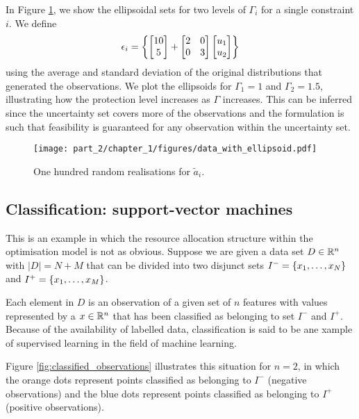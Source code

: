 In Figure \ref{fig:ellipsoids}, we show the ellipsoidal sets for two levels of $\Gamma_i$ for a single constraint $i$. We define 
%
\begin{align}
	\epsilon_i = \left\{ \begin{bmatrix} 10 \\ 5 \end{bmatrix} + \begin{bmatrix} 2 & 0 \\ 0 & 3 \end{bmatrix} \begin{bmatrix} u_1 \\ u_2 \end{bmatrix} \right \}
\end{align}
%
using the average and standard deviation of the original distributions that generated the observations. We plot the ellipsoids for $\Gamma_1 = 1$ and $\Gamma_2 = 1.5$, illustrating how the protection level increases as $\Gamma$ increases. This can be inferred since the uncertainty set covers more of the observations and the formulation is such that feasibility is guaranteed for any observation within the uncertainty set. 
%
\begin{figure}
	\texttt{[image: part\_2/chapter\_1/figures/data\_with\_ellipsoid.pdf]}
	\caption{One hundred random realisations for $\tilde{a}_i$.} \label{fig:ellipsoids}
\end{figure}
%


\subsection{Classification: support-vector machines}

This is an example in which the resource allocation structure within the optimisation model is not as obvious. Suppose we are given a data set $D \in \mathbb{R}^{n}$ with $|D| = N + M$ that can be divided into two disjunct sets $I^- = \left\{ x_1, \dots, x_N \right \}$ and $I^+ = \left\{ x_1,\dots, x_M \right \}$. 

Each element in $D$ is an observation of a given set of $n$ features with values represented by a $x \in \mathbb{R}^n$ that has been classified as belonging to set $I^-$ and $I^+$. Because of the availability of labelled data, classification is said to be ane xample of supervised learning in the field of machine learning. 

Figure \ref{fig:classified_observations} illustrates this situation for $n = 2$, in which the orange dots represent points classified as belonging to $I^-$ (negative observations) and the blue dots represent points classified as belonging to $I^+$ (positive observations).

